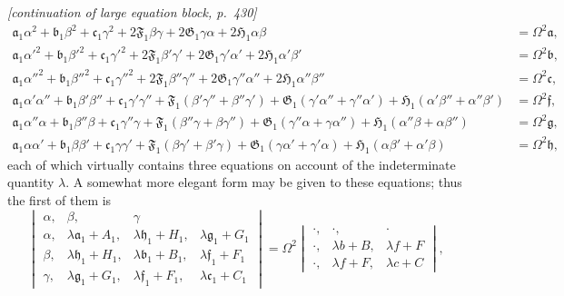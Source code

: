 \documentclass[11pt]{article}
\begin{document}
\noindent\textit{[continuation of large equation block, p.~430]}
\[
\begin{aligned}
\mathfrak{a}_1\alpha^2 + \mathfrak{b}_1\beta^2 + \mathfrak{c}_1\gamma^2 + 2\mathfrak{F}_1\beta\gamma + 2\mathfrak{G}_1\gamma\alpha + 2\mathfrak{H}_1\alpha\beta &= \Omega^2\mathfrak{a},\\
\mathfrak{a}_1\alpha'^2 + \mathfrak{b}_1\beta'^2 + \mathfrak{c}_1\gamma'^2 + 2\mathfrak{F}_1\beta'\gamma' + 2\mathfrak{G}_1\gamma'\alpha' + 2\mathfrak{H}_1\alpha'\beta' &= \Omega^2\mathfrak{b},\\
\mathfrak{a}_1\alpha''^2 + \mathfrak{b}_1\beta''^2 + \mathfrak{c}_1\gamma''^2 + 2\mathfrak{F}_1\beta''\gamma'' + 2\mathfrak{G}_1\gamma''\alpha'' + 2\mathfrak{H}_1\alpha''\beta'' &= \Omega^2\mathfrak{c},\\
\mathfrak{a}_1\alpha'\alpha'' + \mathfrak{b}_1\beta'\beta'' + \mathfrak{c}_1\gamma'\gamma'' + \mathfrak{F}_1(\beta'\gamma'' + \beta''\gamma') + \mathfrak{G}_1(\gamma'\alpha'' + \gamma''\alpha') + \mathfrak{H}_1(\alpha'\beta'' + \alpha''\beta') &= \Omega^2\mathfrak{f},\\
\mathfrak{a}_1\alpha''\alpha + \mathfrak{b}_1\beta''\beta + \mathfrak{c}_1\gamma''\gamma + \mathfrak{F}_1(\beta''\gamma + \beta\gamma'') + \mathfrak{G}_1(\gamma''\alpha + \gamma\alpha'') + \mathfrak{H}_1(\alpha''\beta + \alpha\beta'') &= \Omega^2\mathfrak{g},\\
\mathfrak{a}_1\alpha\alpha' + \mathfrak{b}_1\beta\beta' + \mathfrak{c}_1\gamma\gamma' + \mathfrak{F}_1(\beta\gamma' + \beta'\gamma) + \mathfrak{G}_1(\gamma\alpha' + \gamma'\alpha) + \mathfrak{H}_1(\alpha\beta' + \alpha'\beta) &= \Omega^2\mathfrak{h},
\end{aligned}
\]
each of which virtually contains three equations on account of the indeterminate quantity $\lambda$. A somewhat more elegant form may be given to these equations; thus the first of them is
\[ \begin{vmatrix} \alpha,&\beta,&\gamma\\ \alpha,& \lambda\mathfrak{a}_1+A_1,& \lambda\mathfrak{h}_1+H_1,& \lambda\mathfrak{g}_1+G_1\\ \beta,& \lambda\mathfrak{h}_1+H_1,& \lambda\mathfrak{b}_1+B_1,& \lambda\mathfrak{f}_1+F_1\\ \gamma,& \lambda\mathfrak{g}_1+G_1,& \lambda\mathfrak{f}_1+F_1,& \lambda\mathfrak{c}_1+C_1 \end{vmatrix} = \Omega^2 \begin{vmatrix} \cdot,&\cdot,&\cdot\\ \cdot,& \lambda b+B,& \lambda f+F\\ \cdot,& \lambda f+F,& \lambda c+C \end{vmatrix}, \]
\end{document}
